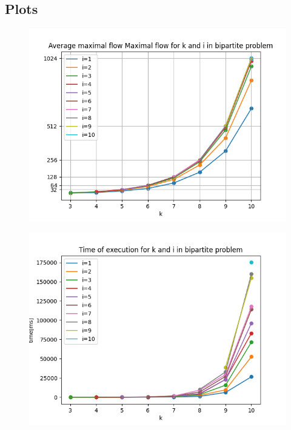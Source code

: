 \documentclass[11pt]{article}
\begin{document}
\subsection{Plots}
\begin{figure}[h!]
    \includegraphics*{zad2_plots/max_flow.png}
\end{figure} 

\begin{figure}[h!]
    \includegraphics*{zad2_plots/time.png}
\end{figure}
\end{document}

